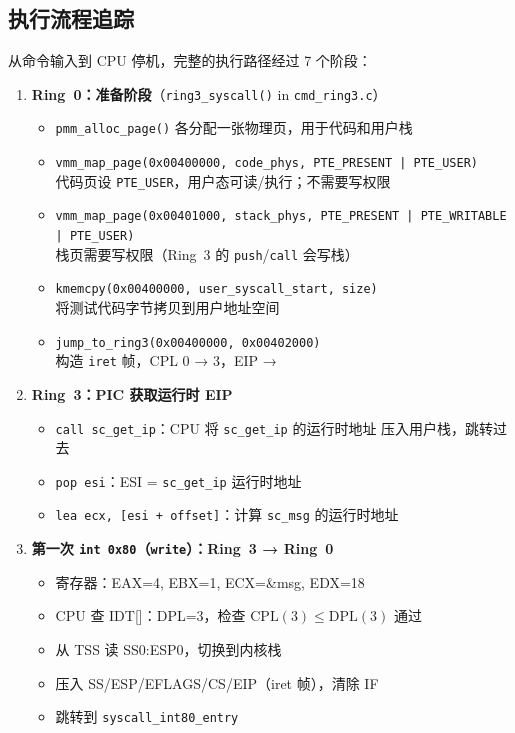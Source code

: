 \subsection{执行流程追踪}

从命令输入到 CPU 停机，完整的执行路径经过 7 个阶段：

\begin{enumerate}
  \item \textbf{Ring~0：准备阶段}（\texttt{ring3\_syscall()} in \texttt{cmd\_ring3.c}）
    \begin{itemize}
      \item \texttt{pmm\_alloc\_page()} 各分配一张物理页，用于代码和用户栈
      \item \texttt{vmm\_map\_page(0x00400000, code\_phys, PTE\_PRESENT | PTE\_USER)}\\
        代码页设 \texttt{PTE\_USER}，用户态可读/执行；不需要写权限
      \item \texttt{vmm\_map\_page(0x00401000, stack\_phys, PTE\_PRESENT | PTE\_WRITABLE | PTE\_USER)}\\
        栈页需要写权限（Ring~3 的 \texttt{push}/\texttt{call} 会写栈）
      \item \texttt{kmemcpy(0x00400000, user\_syscall\_start, size)}\\
        将测试代码字节拷贝到用户地址空间
      \item \texttt{jump\_to\_ring3(0x00400000, 0x00402000)}\\
        构造 \texttt{iret} 帧，CPL 0 → 3，EIP → 
    \end{itemize}

  \item \textbf{Ring~3：PIC 获取运行时 EIP}
    \begin{itemize}
      \item \texttt{call sc\_get\_ip}：CPU 将 \texttt{sc\_get\_ip} 的运行时地址
        压入用户栈，跳转过去
      \item \texttt{pop esi}：ESI = \texttt{sc\_get\_ip} 运行时地址
      \item \texttt{lea ecx, [esi + offset]}：计算 \texttt{sc\_msg} 的运行时地址
    \end{itemize}

  \item \textbf{第一次 \texttt{int 0x80}（\texttt{write}）：Ring~3 → Ring~0}
    \begin{itemize}
      \item 寄存器：EAX=4, EBX=1, ECX=\&msg, EDX=18
      \item CPU 查 IDT[]：DPL=3，检查 $\text{CPL}(3) \leq \text{DPL}(3)$ 通过
      \item 从 TSS 读 SS0:ESP0，切换到内核栈
      \item 压入 SS/ESP/EFLAGS/CS/EIP（iret 帧），清除 IF
      \item 跳转到 \texttt{syscall\_int80\_entry}
    \end{itemize}


\end{enumerate}
